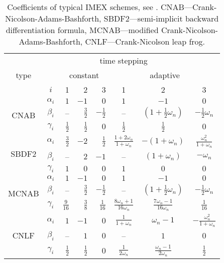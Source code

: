 \documentclass[review]{revtex4-1}
\begin{document}
\begin{table}[!htb]
	\centering
	\caption{Coefficients of typical IMEX schemes, see \cite{Ascher1995,Wang2008}. CNAB---Crank-Nicolson-Adams-Bashforth, SBDF2---semi-implicit backward differentiation formula, MCNAB---modified Crank-Nicolson-Adams-Bashforth, CNLF---Crank-Nicolson leap frog.\label{tbl:TimeSteppingCoefficients}}
	\begin{tabular}{ccrrr|ccc}
		\toprule
		\multirow{3}{*}{type}& & \multicolumn{5}{c}{time stepping} \\
		& & \multicolumn{3}{c|}{constant} & \multicolumn{3}{c}{adaptive}\\
		& $i$ & 1 & 2 & 3 & 1 & 2 & 3 \\
		\midrule
		\multirow{3}{*}{CNAB} & $\alpha_i$ & $1$ & $-1$ & $0$ &
		$1$ & $-1$ & $0$\\
		& $\beta_i$ & -- & $\frac{3}{2}$ & $-\frac{1}{2}$ & 
		-- & $(1+\frac{1}{2}\omega_n)$ & $-\frac{1}{2}\omega_n$\\
		& $\gamma_i$ & $\frac{1}{2}$ & $\frac{1}{2}$ & $0$ &
		$\frac{1}{2}$ & $\frac{1}{2}$ & $0$\\
		\midrule
		\multirow{3}{*}{SBDF2} & $\alpha_i$ & $\frac{3}{2}$ & $-2$ &
		$\frac{1}{2}$ & $\frac{1+2\omega_n}{1+\omega_n}$ & $-(1+\omega_n)$ & $\frac{\omega_n^2}{1+\omega_n}$\\
		& $\beta_i$ & -- & $2$ & $-1$ &
		-- & $(1+\omega_n)$ & $-\omega_n$\\
		& $\gamma_i$ & $1$ & $0$ & $0$ & $1$ & $0$ & $0$\\
		\midrule
		\multirow{3}{*}{MCNAB} & $\alpha_i$ & $1$ & $-1$ & $0$ & $1$ & $-1$ & $0$\\
		& $\beta_i$  & -- & $\frac{3}{2}$ & $-\frac{1}{2}$ & 
		-- & $(1+\frac{1}{2}\omega_n)$ & $-\frac{1}{2}\omega_n$\\
		& $\gamma_i$ & $\frac{9}{16}$ & $\frac{3}{8}$ & $\frac{1}{16}$ & 
		$\frac{8\omega_n+1}{16\omega_n}$ & $\frac{7\omega_n-1}{16\omega_n}$ & $\frac{1}{16}$\\
		\midrule
		\multirow{3}{*}{CNLF} & $\alpha_i$ & $1$ & $-1$ & $0$ 
		& $\frac{1}{1+\omega_n}$ & $\omega_n-1$ & $-\frac{\omega_n^2}{1+\omega_n}$\\
		& $\beta_i$ & -- & $1$ & $0$ & -- & $1$ & $0$ \\
		& $\gamma_i$  & $\frac{1}{2}$ & $\frac{1}{2}$ & $0$ &
		$\frac{1}{2\omega_n}$ & $\frac{\omega_n-1}{2\omega_n}$ & $\frac{1}{2}$\\
		\bottomrule
	\end{tabular}
\end{table}
\end{document}
